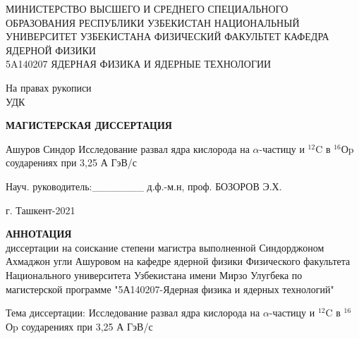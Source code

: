\documentclass[fontsize=14pt]{scrarticle}
\begin{document}
	\begin{titlepage}
		\begin{center}
			\vspace{0.25cm}
        \large 	МИНИСТЕРСТВО ВЫСШЕГО И СРЕДНЕГО СПЕЦИАЛЬНОГО ОБРАЗОВАНИЯ РЕСПУБЛИКИ УЗБЕКИСТАН НАЦИОНАЛЬНЫЙ  УНИВЕРСИТЕТ УЗБЕКИСТАНА ФИЗИЧЕСКИЙ ФАКУЛЬТЕТ КАФЕДРА ЯДЕРНОЙ ФИЗИКИ\\  5A140207 ЯДЕРНАЯ ФИЗИКА И ЯДЕРНЫЕ ТЕХНОЛОГИИ	
			
			\begin{flushright}
			\small{На правах рукописи}\\
           \small{ УДК \ \ \ \ \ \ \ \ \ \ \ }
			\end{flushright}
			\vfill
			
			\large \textbf{МАГИСТЕРСКАЯ ДИССЕРТАЦИЯ }
			
			Ашуров Синдор
			\vfill
			{\large Исследование развал ядра кислорода на $\alpha$-частицу и $^{12}$C в $^{16}$Оp соударениях при 3,25 А ГэВ/с\\
			}
			\bigskip
		\end{center}

         
         \vfill
         
         \begin{flushleft}

Науч. руководитель:\_\_\_\_\_\_\_ д.ф.-м.н, проф. БОЗОРОВ Э.Х.
         \end{flushleft}
		\vfill
		
		\vfill
		\begin{center}
			г. Ташкент-2021
		\end{center}
	\end{titlepage}
	\newpage
	\makenomenclature 
	\renewcommand{\nomname}{Перечень условных обозначений}
    \newcommand*{\nom}[2]{#1\nomenclature{#1}{#2}}
	\printnomenclature[5em]
	\newpage
	\renewcommand{\contentsname}{Содержание}

	\thispagestyle{plain}
\begin{center}
    \large
    \textbf{АННОТАЦИЯ}\\
        диссертации на соискание степени магистра 
        выполненной Синдорджоном Ахмаджон угли Ашуровом на кафедре ядерной физики Физического факультета Национального университета Узбекистана имени Мирзо Улугбека по магистерской программе "5А140207-Ядерная физика и ядерных технологий"
    \vspace{0.4cm}
    
   Тема диссертации: Исследование развал ядра кислорода на $\alpha$-частицу и $^{12}$C в $^{16}$Оp соударениях при 3,25 А ГэВ/с
        
    \vspace{0.4cm}
\end{center}
	
\end{document}
